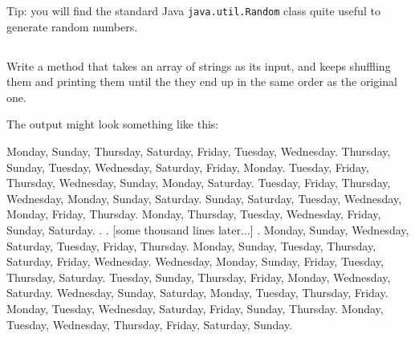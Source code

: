 \documentclass[a4paper, 11pt]{article}
\begin{document}
Tip: you will find the standard Java \texttt{java.util.Random} class quite
useful to generate random numbers.

\subsection{}

Write a method that takes an array of strings as its input, and keeps shuffling
them and printing them until the they end up in the same order as the original
one.

The output might look something like this:

\begin{blackboard}
Monday, Sunday, Thursday, Saturday, Friday, Tuesday, Wednesday.
Thursday, Sunday, Tuesday, Wednesday, Saturday, Friday, Monday.
Tuesday, Friday, Thursday, Wednesday, Sunday, Monday, Saturday.
Tuesday, Friday, Thursday, Wednesday, Monday, Sunday, Saturday.
Sunday, Saturday, Tuesday, Wednesday, Monday, Friday, Thursday.
Monday, Thursday, Tuesday, Wednesday, Friday, Sunday, Saturday.
.
.     [some thousand lines later...]
.
Monday, Sunday, Wednesday, Saturday, Tuesday, Friday, Thursday.
Monday, Sunday, Tuesday, Thursday, Saturday, Friday, Wednesday.
Wednesday, Monday, Sunday, Friday, Tuesday, Thursday, Saturday.
Tuesday, Sunday, Thursday, Friday, Monday, Wednesday, Saturday.
Wednesday, Sunday, Saturday, Monday, Tuesday, Thursday, Friday.
Monday, Tuesday, Wednesday, Saturday, Friday, Sunday, Thursday.
Monday, Tuesday, Wednesday, Thursday, Friday, Saturday, Sunday.
\end{blackboard}

\end{document}
